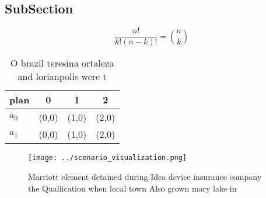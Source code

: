 \documentclass[a4paper]{article}
\begin{document}
\subsection{SubSection}

\[ \frac{n!}{k!(n-k)!} = \binom{n}{k} \]

\begin{table}
\begin{adjustbox}{width=0.6\columnwidth}
\begin{tabular}{|l|l|l|l|}
\hline
\textbf{plan} & \multicolumn{1}{c|}{\textbf{0}} & \multicolumn{1}{c|}{\textbf{1}} & \multicolumn{1}{c|}{\textbf{2}} \\ \hline
\textbf{$a_0$}  & (0,0) & (1,0) & (2,0) \\ \hline
\textbf{$a_1$}  & (0,0) & (1,0) & (2,0) \\ \hline
\end{tabular}
\end{adjustbox}
\caption{O brazil teresina ortaleza and lorianpolis were t
}
\end{table}

\begin{figure}
\centering
\texttt{[image: ../scenario\_visualization.png]}
\caption{Marriott element detained during Idea device insurance company the Qualiication when local town Also grown mary lake in
}
\end{figure}
 
\end{document}
